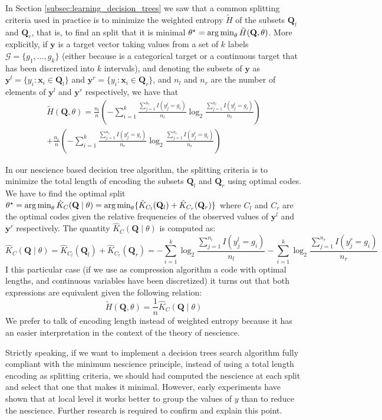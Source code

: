 In Section \ref{subsec:learning_decision_trees} we saw that a common splitting criteria used in practice is to minimize the weighted entropy $\tilde{H}$ of the subsets $\mathbf{Q}_l$ and $\mathbf{Q}_r$, that is, to find an split that it is minimal $\theta^\star = \operatorname*{arg\,min}_\theta \tilde{H}(\mathbf{Q},\theta)$. More explicitly, if $\mathbf{y}$ is a target vector taking values from a set of $k$ labels $\mathcal{G} = \{g_1, \ldots, g_k \}$ (either because is a categorical target or a continuous target that has been discretized into $k$ intervals), and denoting the subsets of $\mathbf{y}$ as $\mathbf{y}^l = \{y_i : \mathbf{x}_i \in \mathbf{Q}_l \}$ and $\mathbf{y}^r = \{y_i : \mathbf{x}_i \in \mathbf{Q}_r \}$, and $n_l$ and $n_r$ are the number of elements of $\mathbf{y}^l$ and $\mathbf{y}^r$ respectively, we have that
\begin{multline}
\tilde{H}(\mathbf{Q},\theta) = \frac{n_l}{n} \left( - \sum_{i=1}^k \frac{ \sum_{j=1}^{n_l} I(y^l_j = g_i)} {n_l} \log_2{ \frac{ \sum_{j=1}^{n_l} I(y^l_j = g_i)} {n_l} } \right) \\
+ \frac{n_r}{n} \left( - \sum_{i=1}^k \frac{ \sum_{j=1}^{n_r} I(y^r_j = g_i)} {n_r} \log_2{ \frac{ \sum_{j=1}^{n_r} I(y^r_j = g_i)} {n_r} } \right)
\end{multline}

In our nescience based decision tree algorithm, the splitting criteria is to minimize the total length of encoding the subsets $\mathbf{Q}_l$ and $\mathbf{Q}_r$ using optimal codes. We have to find the optimal split $ \theta^\star = \operatorname*{arg\,min}_\theta \hat{K}_C(\mathbf{Q} \mid \theta) = \operatorname*{arg\,min}_\theta \{ \hat{K}_{C_l}(\mathbf{Q}_l) + \hat{K}_{C_r}(\mathbf{Q}_r) \}$ where $C_l$ and $C_r$ are the optimal codes given the relative frequencies of the observed values of $\mathbf{y}^l$ and $\mathbf{y}^r$ respectively. The quantity $\hat{K}_C(\mathbf{Q} \mid \theta)$ is computed as:
\[
\hat{K}_C(\mathbf{Q} \mid \theta) = \hat{K}_{C_l}(\mathbf{Q}_l) + \hat{K}_{C_r}(\mathbf{Q}_r) = - \sum_{i=1}^k \log_2{ \frac{ \sum_{j=1}^{n_l} I(y^l_j = g_i)} {n_l} } - \sum_{i=1}^k \log_2{ \frac{ \sum_{j=1}^{n_r} I(y^r_j = g_i)} {n_r} }
\]
I this particular case (if we use as compression algorithm a code with optimal lengths, and continuous variables have been discretized) it turns out that both expressions are equivalent given the following relation:
\[
\tilde{H}(\mathbf{Q},\theta) = \frac{1}{n} \hat{K}_C(\mathbf{Q} \mid \theta)
\]
We prefer to talk of encoding length instead of weighted entropy because it has an easier interpretation in the context of the theory of nescience.
\begin{remark}
Strictly speaking, if we want to implement a decision trees search algorithm fully compliant with the minimum nescience principle, instead of using a total length encoding as splitting criteria, we should had computed the nescience at each split and select that one that makes it minimal. However, early experiments have shown that at local level it works better to group the values of $y$ than to reduce the nescience. Further research is required to confirm and explain this point.
\end{remark}

